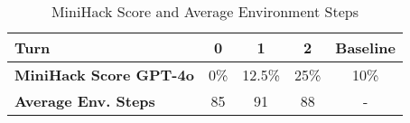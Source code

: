 \begin{table}[h]
\centering
\renewcommand{\arraystretch}{1.5} 
\begin{tabular}{p{4cm}ccc|c}
\toprule
\textbf{Turn} & \textbf{0} & \textbf{1} & \textbf{2} & \textbf{Baseline} \\
\midrule
\textbf{MiniHack Score GPT-4o} & 0\% & 12.5\% & 25\% & 10\% \\
\midrule
\textbf{Average Env. Steps} & 85 & 91 & 88 & - \\
\bottomrule
\end{tabular}
\caption{MiniHack Score and Average Environment Steps}
\label{tab:heldout_mini}
\end{table}

